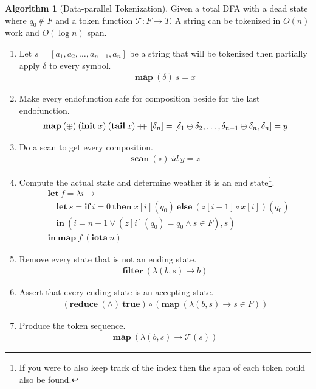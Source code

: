 \documentclass[a4paper,12pt]{article}
\theoremstyle{definition}
\newtheorem{algorithm}{Algorithm}[section]
\newcommand\doubleplus{+\kern-1.3ex+\kern0.8ex}
\begin{document}
\begin{algorithm}[Data-parallel Tokenization]\label{algo:token}
  Given a total DFA with a dead state where $q_0 \notin F$ and a token function $\mathcal{T}: F \to T$. A string can be tokenized in $O(n)$ work and $O(\log n)$ span.
  \begin{enumerate}
    \item Let $s = [a_1, a_2, \dots, a_{n - 1}, a_n]$ be a string that will be tokenized then partially apply $\delta$ to every symbol. 
    \begin{align*}
      \mathbf{map} \: (\delta) \: s = x
    \end{align*}
    \item Make every endofunction safe for composition beside for the last endofunction.
    \begin{align*}
      \mathbf{map} \: (\oplus) \: (\mathbf{init} \:x) \: (\mathbf{tail} \: x) \doubleplus [\delta_n] = [\delta_1 \oplus \delta_2, \dots, \delta_{n - 1} \oplus \delta_n, \delta_n] = y
    \end{align*}
    \item Do a scan to get every composition.
    \begin{align*}
      \mathbf{scan} \: (\circ) \: id \: y = z
    \end{align*}
    \item Compute the actual state and determine weather it is an end state\footnote{If you were to also keep track of the index then the span of each token could also be found.}.
    \begin{align*}
      & \mathbf{let} \: f = \lambda i \to \\
      & \quad \mathbf{let} \: s = \mathbf{if} \: i = 0 \: \mathbf{then} \: x[i](q_0) \: \mathbf{else} \: (z[i - 1] \circ x[i])(q_0) \\
      & \quad \mathbf{in} \: (i = n - 1 \lor (z[i](q_0) = q_0 \land s \in F), s) \\
      & \mathbf{in} \: \mathbf{map} \: f \: (\mathbf{iota} \: n)
    \end{align*}
    \item Remove every state that is not an ending state.
    \begin{align*}
      \mathbf{filter} \: (\lambda(b, s) \to b)
    \end{align*}
    \item Assert that every ending state is an accepting state.
    \begin{align*}
       (\mathbf{reduce} \: (\land)\: \mathbf{true}) \circ (\mathbf{map} \: (\lambda(b, s) \to s \in F))
    \end{align*}
    \item Produce the token sequence.
    \begin{align*}
      \mathbf{map} \: (\lambda(b, s) \to \mathcal{T}(s))
    \end{align*}
  \end{enumerate}
\end{algorithm}
\end{document}
